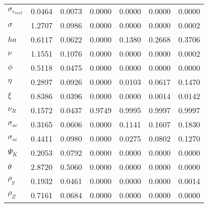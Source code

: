 \begin{center}
\begin{longtable}{lcccccc}
$ \sigma_{{e_{muI}}}   $	 & 	          0.0464	 & 	          0.0073	 & 	          0.0000	 & 	          0.0000	 & 	          0.0000	 & 	          0.0000 \\ 
$ {\sigma}             $	 & 	          1.2707	 & 	          0.0986	 & 	          0.0000	 & 	          0.0000	 & 	          0.0000	 & 	          0.0002 \\ 
$ {ha}                 $	 & 	          0.6117	 & 	          0.0622	 & 	          0.0000	 & 	          0.1380	 & 	          0.2668	 & 	          0.3706 \\ 
$ \nu                  $	 & 	          1.1551	 & 	          0.1076	 & 	          0.0000	 & 	          0.0000	 & 	          0.0000	 & 	          0.0002 \\ 
$ {\phi}               $	 & 	          0.5118	 & 	          0.0475	 & 	          0.0000	 & 	          0.0000	 & 	          0.0000	 & 	          0.0000 \\ 
$ {\eta}               $	 & 	          0.2897	 & 	          0.0926	 & 	          0.0000	 & 	          0.0103	 & 	          0.0617	 & 	          0.1470 \\ 
$ \xi                  $	 & 	          0.8386	 & 	          0.0396	 & 	          0.0000	 & 	          0.0000	 & 	          0.0014	 & 	          0.0142 \\ 
$ {\nu_R}              $	 & 	          0.1572	 & 	          0.0437	 & 	          0.9749	 & 	          0.9995	 & 	          0.9997	 & 	          0.9997 \\ 
$ {\sigma_{ac}}        $	 & 	          0.3165	 & 	          0.0606	 & 	          0.0000	 & 	          0.1141	 & 	          0.1607	 & 	          0.1830 \\ 
$ {\sigma_{ai}}        $	 & 	          0.4411	 & 	          0.0980	 & 	          0.0000	 & 	          0.0275	 & 	          0.0802	 & 	          0.1270 \\ 
$ {\Psi_{K}}           $	 & 	          0.2053	 & 	          0.0792	 & 	          0.0000	 & 	          0.0000	 & 	          0.0000	 & 	          0.0000 \\ 
$ {\theta}             $	 & 	          2.8720	 & 	          0.5060	 & 	          0.0000	 & 	          0.0000	 & 	          0.0000	 & 	          0.0000 \\ 
$ {\rho_g}             $	 & 	          0.1932	 & 	          0.0461	 & 	          0.0000	 & 	          0.0000	 & 	          0.0000	 & 	          0.0014 \\ 
$ {\rho_Z}             $	 & 	          0.7161	 & 	          0.0684	 & 	          0.0000	 & 	          0.0000	 & 	          0.0000	 & 	          0.0000 \\ 

\end{longtable}
\end{center}
